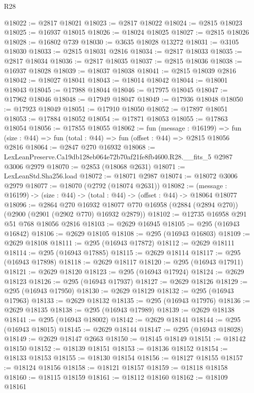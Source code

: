 \begin{lexlean}{R28}
\begin{coremodule}
@18022 := @2817 @18021
@18023 := @2817 @18022
@18024 := @2815 @18023
@18025 := @16937 @18015
@18026 := @18024 @18025
@18027 := @2815 @18026
@18028 := @16802 @739
@18030 := @3635 @18028 @13272
@18031 := @3105 @18030
@18033 := @2815 @18031 @2816
@18034 := @2817 @18033
@18035 := @2817 @18034
@18036 := @2817 @18035
@18037 := @2815 @18036
@18038 := @16937 @18028
@18039 := @18037 @18038
@18041 := @2815 @18039 @2816
@18042 := @18027 @18041
@18043 := @18014 @18042
@18044 := @18001 @18043
@18045 := @17988 @18044
@18046 := @17975 @18045
@18047 := @17962 @18046
@18048 := @17949 @18047
@18049 := @17936 @18048
@18050 := @17923 @18049
@18051 := @17910 @18050
@18052 := @17897 @18051
@18053 := @17884 @18052
@18054 := @17871 @18053
@18055 := @17863 @18054
@18056 := @17855 @18055
@18062 := fun (message : @16199) =>
  fun (size : @44) => fun (total : @44) => fun (offset : @44) => @2815 @18056 @2816
@18064 := @2847 @270 @16932
@18068 := LexLeanPreserve.Ca19db128eb064e72b70af21fe8fb4600.R28.__fits_5 @2987 @3006 @2979
@18070 := @2853 (@18068 @2631)
@18071 := LexLeanStd.Sha256.load
@18072 := @18071 @2987
@18074 := @18072 @3006 @2979
@18077 := @18070 (@2792 (@18074 @2631))
@18082 := (message : @16199) -> (size : @44) -> (total : @44) -> (offset : @44) -> @18064 @18077
@18096 := @2864
    @270
    @16932
    @18077
    @770
    @16958
    (@2884 (@2894 @270))
    (@2900 (@2901 (@2902 @770) @16932 @2879))
@18102 := @12735 @16958 @291 @51 @768 @18056 @2816
@18103 := @2629 @16945
@18105 := @295 (@16943 @16842)
@18106 := @2629 @18105
@18108 := @295 (@16943 @16803)
@18109 := @2629 @18108
@18111 := @295 (@16943 @17872)
@18112 := @2629 @18111
@18114 := @295 (@16943 @17885)
@18115 := @2629 @18114
@18117 := @295 (@16943 @17898)
@18118 := @2629 @18117
@18120 := @295 (@16943 @17911)
@18121 := @2629 @18120
@18123 := @295 (@16943 @17924)
@18124 := @2629 @18123
@18126 := @295 (@16943 @17937)
@18127 := @2629 @18126
@18129 := @295 (@16943 @17950)
@18130 := @2629 @18129
@18132 := @295 (@16943 @17963)
@18133 := @2629 @18132
@18135 := @295 (@16943 @17976)
@18136 := @2629 @18135
@18138 := @295 (@16943 @17989)
@18139 := @2629 @18138
@18141 := @295 (@16943 @18002)
@18142 := @2629 @18141
@18144 := @295 (@16943 @18015)
@18145 := @2629 @18144
@18147 := @295 (@16943 @18028)
@18149 := @2629 @18147 @2663
@18150 := @18145 @18149
@18151 := @18142 @18150
@18152 := @18139 @18151
@18153 := @18136 @18152
@18154 := @18133 @18153
@18155 := @18130 @18154
@18156 := @18127 @18155
@18157 := @18124 @18156
@18158 := @18121 @18157
@18159 := @18118 @18158
@18160 := @18115 @18159
@18161 := @18112 @18160
@18162 := @18109 @18161

\end{coremodule}
\end{lexlean}
